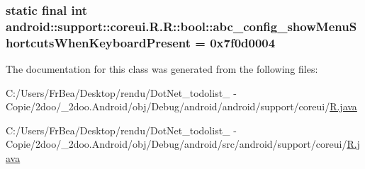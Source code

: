 \hypertarget{classandroid_1_1support_1_1coreui_1_1_r_1_1bool_f4e6c7a6d50479547a2f3d753eb38c6a}{
\subsubsection[{abc\_\-config\_\-showMenuShortcutsWhenKeyboardPresent}]{\setlength{\rightskip}{0pt plus 5cm}static final int android::support::coreui.R.R::bool::abc\_\-config\_\-showMenuShortcutsWhenKeyboardPresent = 0x7f0d0004}}
\label{classandroid_1_1support_1_1coreui_1_1_r_1_1bool_f4e6c7a6d50479547a2f3d753eb38c6a}




The documentation for this class was generated from the following files:\begin{CompactItemize}
\item 
C:/Users/FrBea/Desktop/rendu/DotNet\_\-todolist\_ - Copie/2doo/\_\-2doo.Android/obj/Debug/android/android/support/coreui/\hyperlink{android_2support_2coreui_2_r_8java}{R.java}\item 
C:/Users/FrBea/Desktop/rendu/DotNet\_\-todolist\_ - Copie/2doo/\_\-2doo.Android/obj/Debug/android/src/android/support/coreui/\hyperlink{src_2android_2support_2coreui_2_r_8java}{R.java}\end{CompactItemize}
